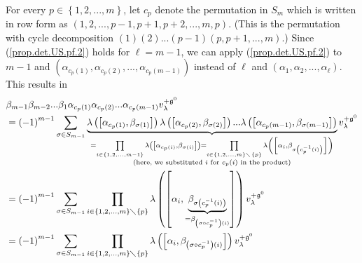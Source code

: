 \documentclass[etingof-lie.tex]{subfiles}
\begin{document}
For every $p\in\left\{  1,2,...,m\right\}  $, let $c_{p}$ denote the
permutation in $S_{m}$ which is written in row form as $\left(
1,2,...,p-1,p+1,p+2,...,m,p\right)  $. (This is the permutation with cycle
decomposition $\left(  1\right)  \left(  2\right)  ...\left(  p-1\right)
\left(  p,p+1,...,m\right)  $.) Since (\ref{prop.det.US.pf.2}) holds for
$\ell=m-1$, we can apply (\ref{prop.det.US.pf.2}) to $m-1$ and $\left(
\alpha_{c_{p}\left(  1\right)  },\alpha_{c_{p}\left(  2\right)  }%
,...,\alpha_{c_{p}\left(  m-1\right)  }\right)  $ instead of $\ell$ and
$\left(  \alpha_{1},\alpha_{2},...,\alpha_{\ell}\right)  $. This results in%
\begin{align*}
&  \beta_{m-1}\beta_{m-2}...\beta_{1}\alpha_{c_{p}\left(  1\right)  }%
\alpha_{c_{p}\left(  2\right)  }...\alpha_{c_{p}\left(  m-1\right)
}v_{\lambda}^{+\mathfrak{g}^{0}}\\
&  =\left(  -1\right)  ^{m-1}\sum\limits_{\sigma\in S_{m-1}}%
\underbrace{\lambda\left(  \left[  \alpha_{c_{p}\left(  1\right)  }%
,\beta_{\sigma\left(  1\right)  }\right]  \right)  \lambda\left(  \left[
\alpha_{c_{p}\left(  2\right)  },\beta_{\sigma\left(  2\right)  }\right]
\right)  ...\lambda\left(  \left[  \alpha_{c_{p}\left(  m-1\right)  }%
,\beta_{\sigma\left(  m-1\right)  }\right]  \right)  }_{\substack{=\prod
\limits_{i\in\left\{  1,2,...,m-1\right\}  }\lambda\left(  \left[
\alpha_{c_{p}\left(  i\right)  },\beta_{\sigma\left(  i\right)  }\right]
\right)  =\prod\limits_{i\in\left\{  1,2,...,m\right\}  \diagdown\left\{
p\right\}  }\lambda\left(  \left[  \alpha_{i},\beta_{\sigma\left(  c_{p}%
^{-1}\left(  i\right)  \right)  }\right]  \right)  \\\text{(here, we
substituted }i\text{ for }c_{p}\left(  i\right)  \text{ in the product)}%
}}v_{\lambda}^{+\mathfrak{g}^{0}}\\
&  =\left(  -1\right)  ^{m-1}\sum\limits_{\sigma\in S_{m-1}}\prod
\limits_{i\in\left\{  1,2,...,m\right\}  \diagdown\left\{  p\right\}  }%
\lambda\left(  \left[  \alpha_{i},\underbrace{\beta_{\sigma\left(  c_{p}%
^{-1}\left(  i\right)  \right)  }}_{=\beta_{\left(  \sigma\circ c_{p}%
^{-1}\right)  \left(  i\right)  }}\right]  \right)  v_{\lambda}^{+\mathfrak{g}%
^{0}}\\
&  =\left(  -1\right)  ^{m-1}\sum\limits_{\sigma\in S_{m-1}}\prod
\limits_{i\in\left\{  1,2,...,m\right\}  \diagdown\left\{  p\right\}  }%
\lambda\left(  \left[  \alpha_{i},\beta_{\left(  \sigma\circ c_{p}%
^{-1}\right)  \left(  i\right)  }\right]  \right)  v_{\lambda}^{+\mathfrak{g}%
^{0}}\\

\end{align*}
\end{document}
